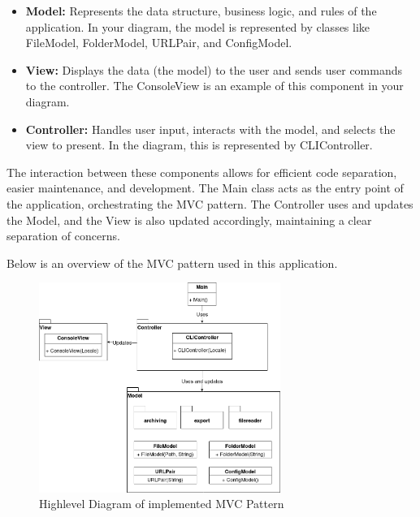 \begin{itemize}
    \item \textbf{Model:} Represents the data structure, business logic, and rules of the application. In your diagram, the model is represented by classes like FileModel, FolderModel, URLPair, and ConfigModel.
    \item \textbf{View:} Displays the data (the model) to the user and sends user commands to the controller. The ConsoleView is an example of this component in your diagram.
    \item \textbf{Controller:} Handles user input, interacts with the model, and selects the view to present. In the diagram, this is represented by CLIController.
    
\end{itemize}

The interaction between these components allows for efficient code separation, easier maintenance, and development. The Main class acts as the entry point of the application, orchestrating the MVC pattern. The Controller uses and updates the Model, and the View is also updated accordingly, maintaining a clear separation of concerns.

Below is an overview of the MVC pattern used in this application.

\begin{figure}[h!]
    \center
    \includegraphics[width=0.7\textwidth]{diagrams/mvc_diagram-Highlevel_MVC.png}
    \caption{Highlevel Diagram of implemented MVC Pattern}
    \label{fig:MVC_Highlevel}
\end{figure}

\clearpage

